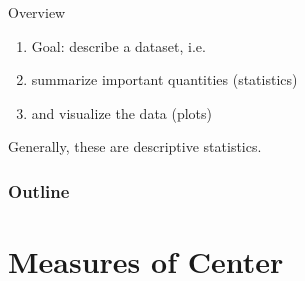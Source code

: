 %
%
%



\subtitle{means, medians, and plots}

\date{20 January 2015}




\begin{frame}
  \maketitle
\end{frame}




\begin{frame}{Overview}
    \begin{enumerate}
        \item Goal: describe a dataset, i.e.
        \item summarize important quantities (statistics)
        \item and visualize the data (plots)
    \end{enumerate}

    Generally, these are \alert{descriptive statistics}.
\end{frame}


\begin{frame}\frametitle<presentation>{Outline}
  \tableofcontents
\end{frame}


\section{Measures of Center}


